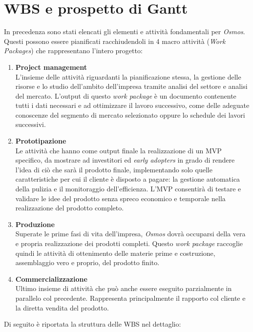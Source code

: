\documentclass[a4paper, 12pt]{article}
\begin{document}
	\section{WBS e prospetto di Gantt}
	In precedenza sono stati elencati gli elementi e attività fondamentali per \emph{Osmos}. Questi possono essere pianificati racchiudendoli in 4 macro attività (\emph{Work Packages}) che rappresentano l'intero progetto:
	\begin{enumerate}
		\item \textbf{Project management}\\
			  L'insieme delle attività riguardanti la pianificazione stessa, la gestione delle risorse e lo studio dell'ambito dell'impresa tramite analisi del settore e analisi del mercato. L'output di questo \emph{work package} è un documento contenente tutti i dati necessari e ad ottimizzare il lavoro successivo, come delle adeguate conoscenze del segmento di mercato selezionato oppure lo schedule dei lavori successivi.
		\item \textbf{Prototipazione}\\
			  Le attività che hanno come output finale la realizzazione di un MVP specifico, da mostrare ad investitori ed \emph{early adopters} in grado di rendere l'idea di ciò che sarà il prodotto finale, implementando solo quelle caratteristiche per cui il cliente è disposto a pagare: la gestione automatica della pulizia e il monitoraggio dell'efficienza. L'MVP consentirà di testare e validare le idee del prodotto senza spreco economico e temporale nella realizzazione del prodotto completo.
		\item \textbf{Produzione}\\
			  Superate le prime fasi di vita dell'impresa, \emph{Osmos} dovrà occuparsi della vera e propria realizzazione dei prodotti completi. Questo \emph{work package} raccoglie quindi le attività di ottenimento delle materie prime e costruzione, assemblaggio vero e proprio, del prodotto finito.
		\item \textbf{Commercializzazione}\\
			  Ultimo insieme di attività che può anche essere eseguito parzialmente in parallelo col precedente. Rappresenta principalmente il rapporto col cliente e la diretta vendita del prodotto.
	\end{enumerate}
	Di seguito è riportata la struttura delle WBS nel dettaglio:
\end{document}
